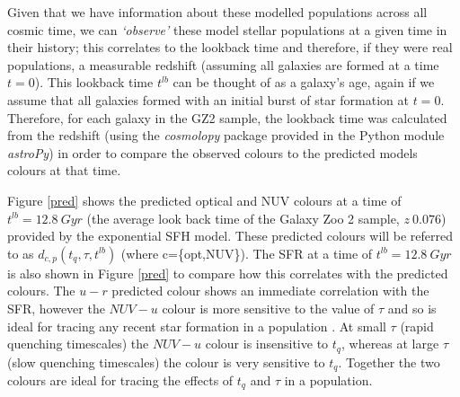 \documentclass{mn2e}
\begin{document}
Given that we have information about these modelled populations across all cosmic time, we can \emph{`observe'} these model stellar populations at a given time in their history; this correlates to the lookback time and therefore, if they were real populations, a measurable redshift (assuming all galaxies are formed at a time $t=0$). This lookback time $t^{lb}$ can be thought of as a galaxy's age, again if we assume that all galaxies formed with an initial burst of star formation at $t=0$. Therefore, for each galaxy in the GZ2 sample, the lookback time was calculated from the redshift (using the \emph{cosmolopy} package provided in the Python module \emph{astroPy}) in order to compare the observed colours to the predicted models colours at that time. 

Figure \ref{pred} shows the predicted optical and NUV colours at a time of $t^{lb} = 12.8 ~Gyr$ (the average look back time of the Galaxy Zoo 2 sample, $z~0.076$) provided by the exponential SFH model. These predicted colours will be referred to as $d_{c,p}(t_{q}, \tau, t^{lb})$ (where c=\{opt,NUV\}). The SFR at a time of $t^{lb}=12.8~Gyr$ is also shown in Figure \ref{pred} to compare how this correlates with the predicted colours. The $u-r$ predicted colour shows an immediate correlation with the SFR, however the $NUV-u$ colour is more sensitive to the value of $\tau$ and so is ideal for tracing any recent star formation in a population . At small $\tau$ (rapid quenching timescales) the $NUV-u$ colour is insensitive to $t_{q}$, whereas at large $\tau$ (slow quenching timescales) the colour is very sensitive to $t_{q}$. Together the two colours are ideal for tracing the effects of $t_{q}$ and $\tau$ in a population. 
\end{document}
